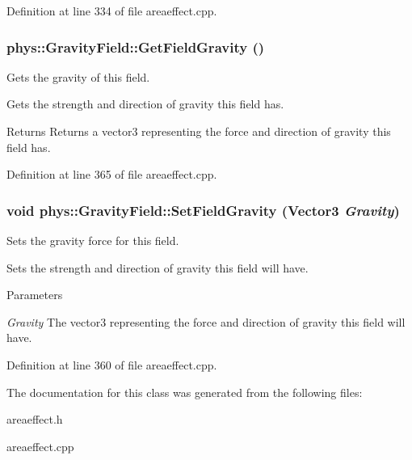 Definition at line 334 of file areaeffect.cpp.

\hypertarget{classphys_1_1GravityField_ae776978b7e8fa1d656bdb216aa6f2d20}{
\subsubsection[{GetFieldGravity}]{ phys::GravityField::GetFieldGravity ()}}
\label{d4/d8a/classphys_1_1GravityField_ae776978b7e8fa1d656bdb216aa6f2d20}


Gets the gravity of this field. 

Gets the strength and direction of gravity this field has. \begin{DoxyReturn}{Returns}
Returns a vector3 representing the force and direction of gravity this field has. 
\end{DoxyReturn}


Definition at line 365 of file areaeffect.cpp.

\hypertarget{classphys_1_1GravityField_a7cebfe216580e9ef607a2ea070cbeaec}{
\subsubsection[{SetFieldGravity}]{\setlength{\rightskip}{0pt plus 5cm}void phys::GravityField::SetFieldGravity ({\bf Vector3} {\em Gravity})}}
\label{d4/d8a/classphys_1_1GravityField_a7cebfe216580e9ef607a2ea070cbeaec}


Sets the gravity force for this field. 

Sets the strength and direction of gravity this field will have. 
\begin{DoxyParams}{Parameters}
\item[{\em Gravity}]The vector3 representing the force and direction of gravity this field will have. \end{DoxyParams}


Definition at line 360 of file areaeffect.cpp.



The documentation for this class was generated from the following files:\begin{DoxyCompactItemize}
\item 
areaeffect.h\item 
areaeffect.cpp\end{DoxyCompactItemize}
